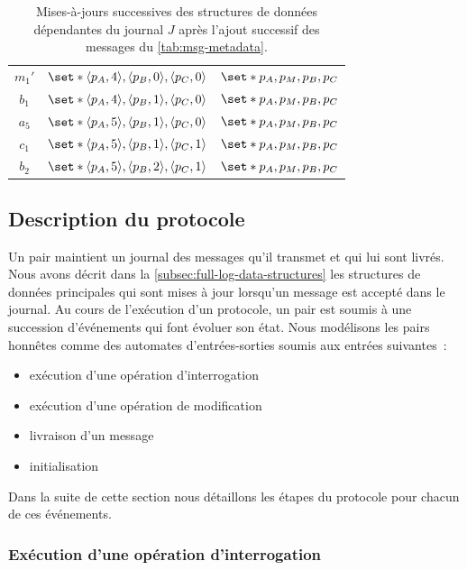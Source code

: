 \begin{table}[ht]
\begin{subtable}{\linewidth}
\begin{tabular}{ccc}
        $m_1'$ & $\set*{\tuple*{p_A, 4}, \tuple*{p_B, 0}, \tuple*{p_C, 0}}$ & $\set*{p_A,p_M,p_B,p_C}$ \\
        $b_1$ & $\set*{\tuple*{p_A, 4}, \tuple*{p_B, 1}, \tuple*{p_C, 0}}$ & $\set*{p_A,p_M,p_B,p_C}$ \\
        $a_5$ & $\set*{\tuple*{p_A, 5}, \tuple*{p_B, 1}, \tuple*{p_C, 0}}$ & $\set*{p_A,p_M,p_B,p_C}$ \\
        $c_1$ & $\set*{\tuple*{p_A, 5}, \tuple*{p_B, 1},\tuple*{p_C, 1}}$ & $\set*{p_A,p_M,p_B,p_C}$ \\
        $b_2$ & $\set*{\tuple*{p_A, 5}, \tuple*{p_B, 2}, \tuple*{p_C, 1}}$ & $\set*{p_A,p_M,p_B,p_C}$ \\
    \end{tabular}
    \end{subtable}
    \caption[Exemple de mises-à-jours de structures de données dépendantes d'un' journal]{Mises-à-jours successives des structures de données dépendantes du journal $J$ après l'ajout successif des messages du \autoref{tab:msg-metadata}.}\label{tab:data-structure-update}
\end{table}
 

\subsection{Description du protocole}\label{subsec:full-log-protocol-desc}

Un pair maintient un journal des messages qu'il transmet et qui lui sont livrés.
Nous avons décrit dans la \autoref{subsec:full-log-data-structures} les structures de données principales qui sont mises à jour lorsqu'un message est accepté dans le journal.
Au cours de l'exécution d'un protocole, un pair est soumis à une succession d'événements qui font évoluer son état.
Nous modélisons les pairs honnêtes comme des automates d'entrées-sorties soumis aux entrées suivantes~:
\begin{itemize}
    \item exécution d'une opération d'interrogation
    \item exécution d'une opération de modification
    \item livraison d'un message
    \item initialisation
\end{itemize}

Dans la suite de cette section nous détaillons les étapes du protocole pour chacun de ces événements.

\subsubsection{Exécution d'une opération d'interrogation}

